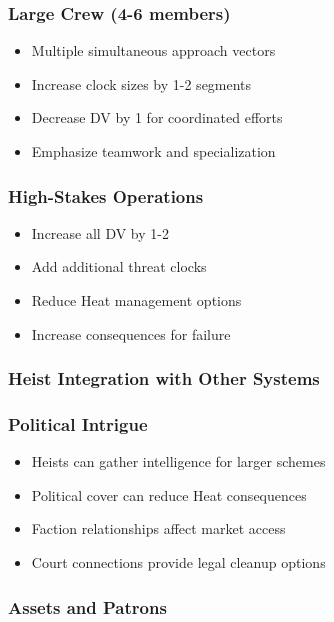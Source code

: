 \documentclass[11pt]{article}
\begin{document}
\subsubsection{Large Crew (4-6 members)}

\begin{itemize}
    \item Multiple simultaneous approach vectors
    \item Increase clock sizes by 1-2 segments
    \item Decrease DV by 1 for coordinated efforts
    \item Emphasize teamwork and specialization
\end{itemize}

\subsubsection{High-Stakes Operations}

\begin{itemize}
    \item Increase all DV by 1-2
    \item Add additional threat clocks
    \item Reduce Heat management options
    \item Increase consequences for failure
\end{itemize}

\subsubsection{Heist Integration with Other Systems}

\subsubsection{Political Intrigue}

\begin{itemize}
    \item Heists can gather intelligence for larger schemes
    \item Political cover can reduce Heat consequences
    \item Faction relationships affect market access
    \item Court connections provide legal cleanup options
\end{itemize}

\subsubsection{Assets and Patrons}
\end{document}
